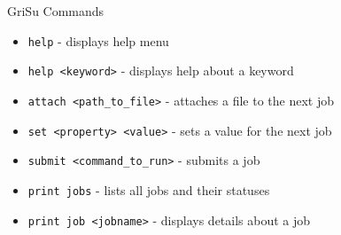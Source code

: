 \documentclass[final,t]{beamer}
\begin{document}
\begin{frame}[fragile]{}
\begin{columns}[t]
\begin{column}{.35\linewidth}
      
      \begin{block}{GriSu Commands}
        \begin{itemize}
        \item \verb|help| - displays help menu
        \item \verb|help <keyword>| - displays help about a keyword
        \item \verb|attach <path_to_file>| - attaches a file to the next job
        \item \verb|set <property> <value>| - sets a value for the next job
        \item \verb|submit <command_to_run>| - submits a job
        \item \verb|print jobs| - lists all jobs and their statuses
        \item \verb|print job <jobname>| - displays details about a job
        \end{itemize}
      \end{block}
      
    \end{column}
  \end{columns}
\end{frame}
\end{document}
